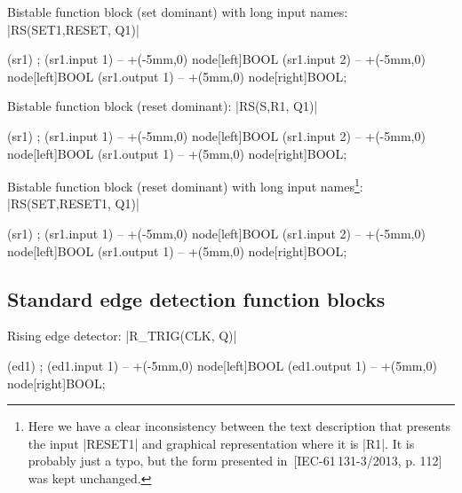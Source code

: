 \documentclass[a4paper]{ltxdoc}
\begin{document}
\noindent{}Bistable function block (set dominant) with long input names: |RS(SET1,RESET, Q1)|
\begin{codeexample}[width=6cm,pre={\begin{tikzpicture}[circuit plc ladder,thick]},post=\end{tikzpicture}]
\node[block,inputs={SET1,RESET},outputs={Q1},
   symbol=SR,minimum width=18mm] (sr1) {};
\draw (sr1.input 1) -- +(-5mm,0) node[left]{BOOL}
      (sr1.input 2) -- +(-5mm,0) node[left]{BOOL}
      (sr1.output 1) -- +(5mm,0) node[right]{BOOL};
\end{codeexample}

\noindent{}Bistable function block (reset dominant): |RS(S,R1, Q1)|
\begin{codeexample}[width=6cm,pre={\begin{tikzpicture}[circuit plc ladder,thick]},post=\end{tikzpicture}]
\node[block,inputs={S,R1},outputs={Q1},
   symbol=SR,minimum width=18mm] (sr1) {};
\draw (sr1.input 1) -- +(-5mm,0) node[left]{BOOL}
      (sr1.input 2) -- +(-5mm,0) node[left]{BOOL}
      (sr1.output 1) -- +(5mm,0) node[right]{BOOL};
\end{codeexample}

\noindent{}Bistable function block (reset dominant) with long input names\footnote{Here we have a clear inconsistency between the text description that presents the input |RESET1| and graphical representation where it is |R1|. It is probably just a typo, but the form presented in~[IEC-61\,131-3/2013, p. 112] was kept unchanged.}: |RS(SET,RESET1, Q1)|
\begin{codeexample}[width=6cm,pre={\begin{tikzpicture}[circuit plc ladder,thick]},post=\end{tikzpicture}]
\node[block,inputs={SET,R1},outputs={Q1},
   symbol=SR,minimum width=18mm] (sr1) {};
\draw (sr1.input 1) -- +(-5mm,0) node[left]{BOOL}
      (sr1.input 2) -- +(-5mm,0) node[left]{BOOL}
      (sr1.output 1) -- +(5mm,0) node[right]{BOOL};
\end{codeexample}


\subsection{Standard edge detection function blocks}

Rising edge detector: |R_TRIG(CLK, Q)|
\begin{codeexample}[width=6cm,pre={\begin{tikzpicture}[circuit plc ladder,thick]},post=\end{tikzpicture}]
\node[block,inputs={CLK},outputs={Q},
   symbol=R\_TRIG,minimum width=20mm] (ed1) {};
\draw (ed1.input 1) -- +(-5mm,0) node[left]{BOOL}
      (ed1.output 1) -- +(5mm,0) node[right]{BOOL};
\end{codeexample}
\end{document}
